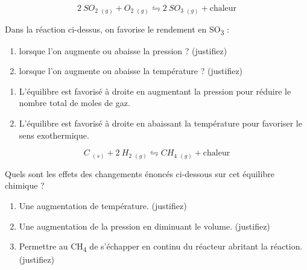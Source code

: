 \documentclass[
  11pt,
  a4paper,
  openany]{book}
\providecommand{\tightlist}{%
  \setlength{\itemsep}{0pt}\setlength{\parskip}{0pt}}
\begin{document}
\begin{Exercise}

\[
  2\ SO_2\ _{(g)} + O_2\ _{(g)} \leftrightharpoons 2\ SO_3\ _{(g)} + \text{chaleur}
\]

Dans la réaction ci-dessus, on favorise le rendement en SO\textsubscript{3} :

\begin{enumerate}
\def\labelenumi{\alph{enumi}.}
\tightlist
\item
  lorsque l'on augmente ou abaisse la pression ? (justifiez)
\item
  lorsque l'on augmente ou abaisse la température ? (justifiez)
\end{enumerate}

\end{Exercise}

\begin{Answer}

\begin{enumerate}
\def\labelenumi{\alph{enumi}.}
\tightlist
\item
  L'équilibre est favorisé à droite en augmentant la pression pour réduire le nombre total de moles de gaz.
\item
  L'équilibre est favorisé à droite en abaissant la température pour favoriser le sens exothermique.
\end{enumerate}

\end{Answer}

\clearpage

\begin{Exercise}

\[
  C\ _{(s)} + 2\ H_2\ _{(g)} \leftrightharpoons CH_4\ _{(g)} + \text{chaleur}
\]

Quels sont les effets des changements énoncés ci-dessous sur cet équilibre chimique ?

\begin{enumerate}
\def\labelenumi{\alph{enumi}.}
\tightlist
\item
  Une augmentation de température. (justifiez)
\item
  Une augmentation de la pression en diminuant le volume. (justifiez)
\item
  Permettre au CH\textsubscript{4} de s'échapper en continu du réacteur abritant la réaction. (justifiez)
\end{enumerate}

\end{Exercise}
\end{document}
